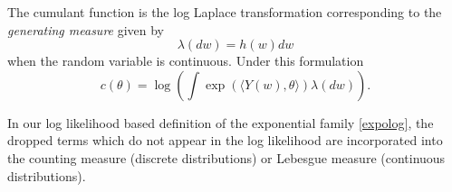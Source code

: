 \documentclass[
  ignorenonframetext,
]{beamer}
\begin{document}
\begin{frame}{}
\protect\hypertarget{section}{}
The cumulant function is the log Laplace transformation corresponding to
the \emph{generating measure} given by \[
  \lambda(dw) = h(w)dw
\] when the random variable is continuous. Under this formulation \[
  c(\theta) = \log\left(\int \exp\left(\langle Y(w),\theta\rangle\right) \lambda(dw)\right).
\]

In our log likelihood based definition of the exponential family
\eqref{expolog}, the dropped terms which do not appear in the log
likelihood are incorporated into the counting measure (discrete
distributions) or Lebesgue measure (continuous distributions).
\end{frame}
\end{document}
